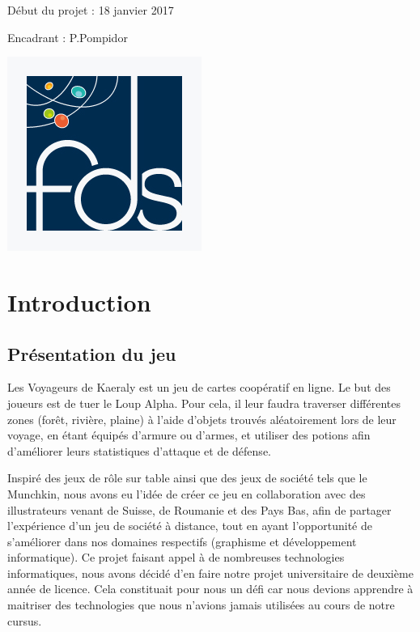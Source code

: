 \documentclass[12pt]{report}
\begin{document}
\begin{titlepage}
\begin{center}
				Début du projet : 18 janvier 2017
				
				Encadrant : P.Pompidor

			\vfill

			\includegraphics[scale=0.3]{images/logo-fds.jpg}~

		\end{center}

	\end{titlepage}

	\tableofcontents

	\chapter*{Introduction}

		\section*{Présentation du jeu}
  	Les Voyageurs de Kaeraly est un jeu de cartes coopératif en ligne. Le but des joueurs est de tuer le Loup Alpha. Pour cela, il leur faudra traverser différentes zones (forêt, rivière, plaine) à l'aide d'objets trouvés aléatoirement lors de leur voyage, en étant équipés d'armure ou d'armes, et utiliser des potions afin d'améliorer leurs statistiques d'attaque et de défense.

  	Inspiré des jeux de rôle sur table ainsi que des jeux de société tels que le Munchkin, nous avons eu l'idée de créer ce jeu en collaboration avec des illustrateurs venant de Suisse, de Roumanie et des Pays Bas, afin de partager l'expérience d'un jeu de société à distance, tout en ayant l'opportunité de s'améliorer dans nos domaines respectifs (graphisme et développement informatique). Ce projet faisant appel à de nombreuses technologies informatiques, nous avons décidé d'en faire notre projet universitaire de deuxième année de licence. Cela constituait pour nous un défi car nous devions apprendre à maitriser des technologies que nous n'avions jamais utilisées au cours de notre cursus. 
\end{document}
